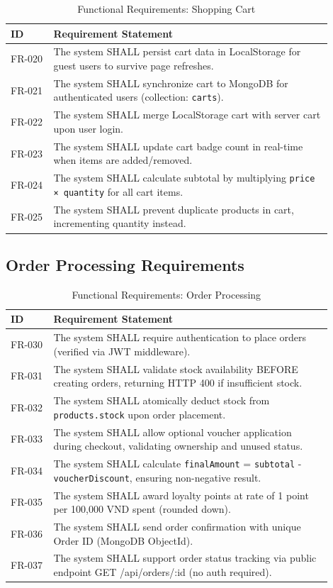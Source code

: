 \begin{table}[H]
\centering
\caption{Functional Requirements: Shopping Cart}
\label{tab:fr_cart}
\small
\begin{tabular}{@{}p{0.12\linewidth}p{0.78\linewidth}@{}}
\toprule
\textbf{ID} & \textbf{Requirement Statement} \\
\midrule
FR-020 & The system SHALL persist cart data in LocalStorage for guest users to survive page refreshes. \\
FR-021 & The system SHALL synchronize cart to MongoDB for authenticated users (collection: \texttt{carts}). \\
FR-022 & The system SHALL merge LocalStorage cart with server cart upon user login. \\
FR-023 & The system SHALL update cart badge count in real-time when items are added/removed. \\
FR-024 & The system SHALL calculate subtotal by multiplying \texttt{price × quantity} for all cart items. \\
FR-025 & The system SHALL prevent duplicate products in cart, incrementing quantity instead. \\
\bottomrule
\end{tabular}
\end{table}

\subsection{Order Processing Requirements}

\begin{table}[H]
\centering
\caption{Functional Requirements: Order Processing}
\label{tab:fr_orders}
\small
\begin{tabular}{@{}p{0.12\linewidth}p{0.78\linewidth}@{}}
\toprule
\textbf{ID} & \textbf{Requirement Statement} \\
\midrule
FR-030 & The system SHALL require authentication to place orders (verified via JWT middleware). \\
FR-031 & The system SHALL validate stock availability BEFORE creating orders, returning HTTP 400 if insufficient stock. \\
FR-032 & The system SHALL atomically deduct stock from \texttt{products.stock} upon order placement. \\
FR-033 & The system SHALL allow optional voucher application during checkout, validating ownership and unused status. \\
FR-034 & The system SHALL calculate \texttt{finalAmount} = \texttt{subtotal} - \texttt{voucherDiscount}, ensuring non-negative result. \\
FR-035 & The system SHALL award loyalty points at rate of 1 point per 100,000 VND spent (rounded down). \\
FR-036 & The system SHALL send order confirmation with unique Order ID (MongoDB ObjectId). \\
FR-037 & The system SHALL support order status tracking via public endpoint GET /api/orders/:id (no auth required). \\
\bottomrule
\end{tabular}
\end{table}

